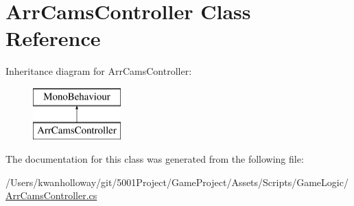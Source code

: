 \hypertarget{class_arr_cams_controller}{}\section{Arr\+Cams\+Controller Class Reference}
\label{class_arr_cams_controller}
Inheritance diagram for Arr\+Cams\+Controller\+:\begin{figure}[H]
\begin{center}
\leavevmode
\includegraphics[height=2.000000cm]{class_arr_cams_controller}
\end{center}
\end{figure}


The documentation for this class was generated from the following file\+:\begin{DoxyCompactItemize}
\item 
/\+Users/kwanholloway/git/5001\+Project/\+Game\+Project/\+Assets/\+Scripts/\+Game\+Logic/\hyperlink{_arr_cams_controller_8cs}{Arr\+Cams\+Controller.\+cs}\end{DoxyCompactItemize}
